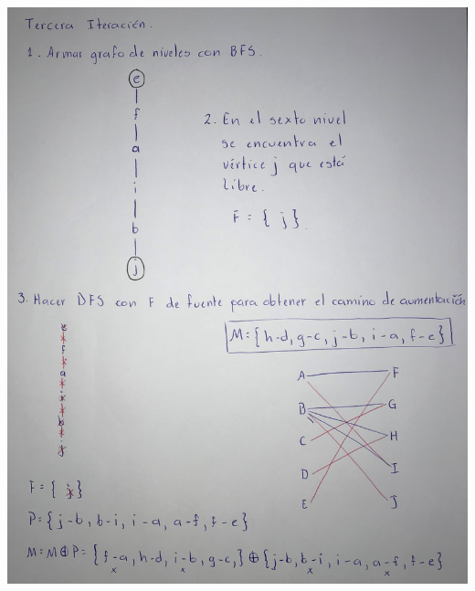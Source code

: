 \documentclass[12pt,a4paper]{article}
\begin{document}
\newpage
\centering
\includegraphics[width=\textwidth, height=\textheight,keepaspectratio]{images/ht3.jpg}

\newpage
\nocite{*}


\end{document}
